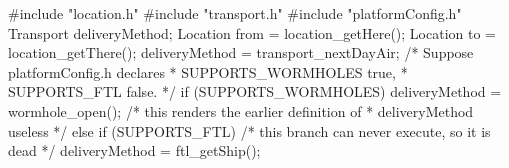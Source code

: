 #include "location.h"
#include "transport.h"
#include "platformConfig.h"
Transport deliveryMethod;
Location from = location_getHere();
Location to = location_getThere();
deliveryMethod = transport_nextDayAir;
/* Suppose platformConfig.h declares 
 * SUPPORTS_WORMHOLES true,
 * SUPPORTS_FTL false. */
if (SUPPORTS_WORMHOLES) {
    deliveryMethod = wormhole_open();
    /* this renders the earlier definition of 
     * deliveryMethod useless */
} else if (SUPPORTS_FTL) {
    /* this branch can never execute, so it is dead */
    deliveryMethod = ftl_getShip();
}